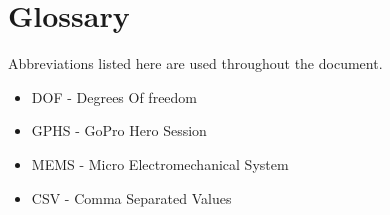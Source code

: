 \chapter*{Glossary}

Abbreviations listed here are used throughout the document.

\begin{itemize}

\item DOF - Degrees Of freedom
\item GPHS - GoPro Hero Session
\item MEMS - Micro Electromechanical System
\item CSV - Comma Separated Values


\end{itemize}
